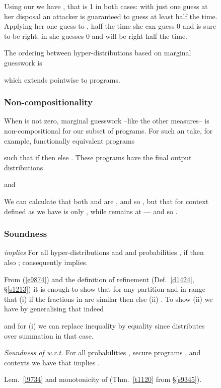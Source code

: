 \documentclass[runningheads]{llncs}
\newcommand\Sec[1] {Sec.~\ref{#1}}
\renewcommand\Sec[1] {\S\ref{#1}}
\newcommand\Eqn[1] {(\ref{#1})}
\newenvironment{Figure}[2][t]{\begin{figure}[#1]\def\Label{#2}\small}{\label{\Label}\end{figure}}
\newenvironment{Theorem}[2]{\begin{theorem}\label{#2}\textit{#1}\rm\quad}{\hfill\end{theorem}}
\newenvironment{Lemma}[2]{\begin{lemma}\label{#2}\textit{#1}\rm\quad}{\hfill\end{lemma}}
\newcommand\Thm[1] {Thm.~\ref{#1}}
\newcommand\Lem[1] {Lem.~\ref{#1}}
\newcommand\Def[1] {Def.~\ref{#1}}
\begin{document}
\begin{Figure}[ht!]{f1228}
Using our  we have , that is 1 in both cases: with just one guess at her disposal an attacker is guaranteed to guess  at least half the time. Applying her one guess to , half the time she can guess 0 and is sure to be right; in  she guesses 0 and will be right half the time.

The ordering between hyper-distributions based on marginal guesswork is 

which extends pointwise to programs.

\subsubsection{Non-compositionality}

When  is not zero, marginal guesswork --like the other measures-- is non-compositional for our subset of programs. For such an  take, for example, functionally equivalent programs

such that if  then  else . These programs have the final output distributions
\medskip\par\noindent
\hfill\hfill\makebox[10pt][r]{()}
\par\noindent
and 
\hfill\hfill\makebox[10pt][r]{()}\medskip\par\noindent
We can calculate that both  and  are , and so , but that for context  defined as  we have  is only , while  remains at  --- and so . 

\subsubsection{Soundness}

\begin{Lemma}{ implies }{l9734}
For all hyper-distributions  and  and probabilities , if  then also ; consequently  implies.
\begin{Proof}
From \Eqn{e9874} and the definition of refinement (\Def{d1424}, \Sec{s1213}) it is enough to show that for any partition  and  in range that (i) if the fractions in  are similar then  else (ii) . To show (ii) we have by generalising  that indeed

and for (i) we can replace inequality by equality since  distributes over summation in that case. 
\end{Proof}
\end{Lemma}


\begin{Theorem}{Soundness of  w.r.t. }{l9543}
For all probabilities , secure programs ,  and contexts  we have that  implies .
\begin{Proof}
\Lem{l9734} and monotonicity of  (\Thm{t1120} from \Sec{s9345}).
\end{Proof}
\end{Theorem}


\end{Figure}
\end{document}
